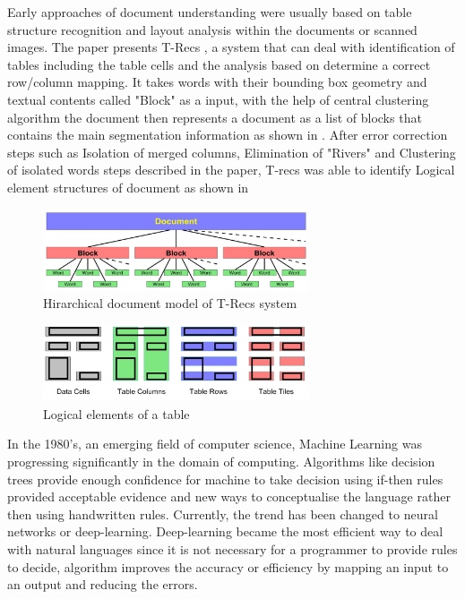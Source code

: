 Early approaches of document understanding were usually based on table structure recognition and layout analysis within the documents or scanned images. The paper presents T-Recs \cite{kieninger1998paper}, a system that can deal with identification of tables including the table cells and the analysis based on determine a correct row/column mapping. It takes words with their bounding box geometry and textual contents called "Block" as a input, with the help of central clustering algorithm the document then represents a document as a list of blocks that contains the main segmentation information as shown in . After error correction steps such as Isolation of merged columns, Elimination of "Rivers" and Clustering of isolated words steps described in the paper, T-recs was able to identify Logical element structures of document as shown in 
\begin{figure}[hb]
    \centering
    \includegraphics[width=0.7\textwidth]{chapters/images/Literature_review/T_Recs_Blocks.JPG}
    \caption{Hirarchical document model of T-Recs system \cite{kieninger1998paper}}
    \label{fig:Hirarchical_document_model_of_T-Recs_system}
\end{figure}
\begin{figure}[hb]
    \centering
    \includegraphics[width=0.7\textwidth]{chapters/images/Literature_review/T_RecsJPG.JPG }
    \caption{Logical elements of a table \cite{kieninger1998paper}}
    \label{fig:T_recs}
\end{figure}

In the 1980's, an emerging field of computer science, Machine Learning was progressing significantly in the domain of computing. Algorithms like decision trees provide enough confidence for machine to take decision using if-then rules provided acceptable evidence and new ways to conceptualise the language rather then using handwritten rules. Currently, the trend has been changed to neural networks or deep-learning. Deep-learning became the most efficient way to deal with natural languages since it is not necessary for a programmer to provide rules to decide, algorithm improves the accuracy or efficiency by mapping an input to an output and reducing the errors. 

